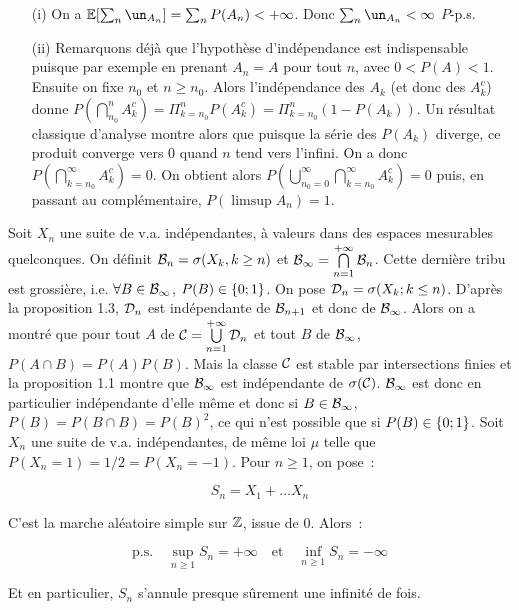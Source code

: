 \dem \begin{itemize}
\item[(i)]{} On a $\esp{\sum_n \un_{A_n}} = \sum_n P(A_n) <+\infty$. Donc $\sum_n \un_{A_n}<\infty$
$P$-p.s.
\item[(ii)]{} Remarquons déjà que l'hypothèse d'indépendance est indispensable puisque par exemple
en prenant $A_n = A$ pour tout $n$, avec $0<P(A)<1$. Ensuite
on fixe $n_0$ et $n\geq n_0$. Alors l'indépendance des $A_k$ (et donc des $A_k^c$) donne 
$P(\bigcap_{n_0}^n A_k^c) = \Pi_{k=n_0}^n P(A_k^c) = \Pi_{k=n_0}^{n}(1-P(A_k))$. Un résultat 
classique d'analyse montre alors que puisque la série des $P(A_k)$ diverge, ce produit converge 
vers $0$ quand $n$ tend vers l'infini. On a donc $P(\bigcap\limits_{k=n_0}^{\infty}A_k^c) = 0$.
On obtient alors $P(\bigcup\limits_{n_0 = 0}^{\infty}\bigcap\limits_{k=n_0}^{\infty}A_k^c) = 0$
puis, en passant au complémentaire, $P(\limsup A_n) = 1$.
\end{itemize}\par\findem
{} Soit $X_n$ une suite de v.a. indépendantes, à valeurs dans des 
espaces mesurables quelconques. On définit $\mathcal{B}_n = \sigma(X_k, k\geq n)$ et $\mathcal{B}_{\infty} = 
\bigcap\limits_{n=1}^{+\infty} \mathcal{B}_n$. Cette dernière tribu est grossière, i.e. $\forall B\in\mathcal{B}_{\infty}$, $P(B)\in\{0;1\}$.
\dem On pose $\mathcal{D}_n = \sigma(X_k; k\leq n)$. D'après la proposition 1.3, $\mathcal{D}_n$ est indépendante
de $\mathcal{B}_{n+1}$ et donc de $\mathcal{B}_{\infty}$. Alors on a montré que pour tout $A$ de 
$\mathcal{C} = \bigcup\limits_{n=1}^{+\infty}\mathcal{D}_n$ et tout $B$ de $\mathcal{B}_{\infty}$, $P(A\cap B)=P(A)P(B)$.
Mais la classe $\mathcal{C}$ est stable par intersections finies et la proposition 1.1 montre que 
$\mathcal{B}_{\infty}$ est indépendante de $\sigma{(\mathcal{C})}$. $\mathcal{B}_{\infty}$ est donc en particulier 
indépendante d'elle même et donc si $B \in \mathcal{B}_{\infty}$, $P(B) = P(B\cap B) = P(B)^2$, ce qui
n'est possible que si $P(B)\in\{0; 1\}$.\findem
{}
 Soit $X_n$ une suite de v.a. indépendantes, 
de même loi $\mu$ telle que $P(X_n=1) = 1/2 = P(X_n= -1)$. Pour $n\geq 1$, on pose~:\par
$$S_n = X_1 + \ldots X_n$$\par
C'est la marche aléatoire simple sur $\mathbb{Z}$, issue de $0$. Alors~:\par
$$\mathrm{p.s.}\quad\sup_{n\geq 1}S_n=+\infty\quad\mathrm{et}\quad\inf_{n\geq 1} S_n=-\infty$$\par
Et en particulier, $S_n$ s'annule presque sûrement une infinité de fois.
